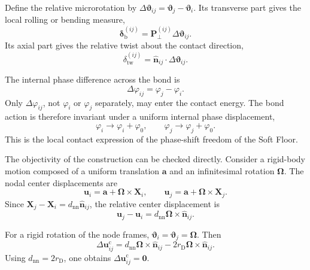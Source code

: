 Define the relative microrotation by $\Delta\boldsymbol{\vartheta}_{ij} = \boldsymbol{\vartheta}_j-\boldsymbol{\vartheta}_i$. Its transverse part gives the local rolling or bending measure,
\begin{equation}
    \boldsymbol{\delta}_{\mathrm{b}}^{(ij)} = \mathbf{P}_{\perp}^{(ij)} \Delta\boldsymbol{\vartheta}_{ij}.
\end{equation}
Its axial part gives the relative twist about the contact direction,
\begin{equation}
    \delta_{\mathrm{tw}}^{(ij)} = \hat{\mathbf{n}}_{ij} \cdot \Delta\boldsymbol{\vartheta}_{ij}.
\end{equation}

The internal phase difference across the bond is
\begin{equation}
    \Delta\varphi_{ij} = \varphi_j-\varphi_i.
\end{equation}
Only $\Delta\varphi_{ij}$, not $\varphi_i$ or $\varphi_j$ separately, may enter the contact energy. The bond action is therefore invariant under a uniform internal phase displacement,
\begin{equation}
    \varphi_i\rightarrow\varphi_i+\varphi_0, \qquad \varphi_j\rightarrow\varphi_j+\varphi_0.
\end{equation}
This is the local contact expression of the phase-shift freedom of the Soft Floor.

The objectivity of the construction can be checked directly. Consider a rigid-body motion composed of a uniform translation $\mathbf{a}$ and an infinitesimal rotation $\boldsymbol{\Omega}$. The nodal center displacements are
\begin{equation}
    \mathbf{u}_i = \mathbf{a}+\boldsymbol{\Omega}\times\mathbf{X}_i, \qquad \mathbf{u}_j = \mathbf{a}+\boldsymbol{\Omega}\times\mathbf{X}_j.
\end{equation}
Since $\mathbf{X}_j-\mathbf{X}_i = d_{\mathrm{nn}}\hat{\mathbf{n}}_{ij}$, the relative center displacement is
\begin{equation}
    \mathbf{u}_j-\mathbf{u}_i = d_{\mathrm{nn}} \boldsymbol{\Omega}\times\hat{\mathbf{n}}_{ij}.
\end{equation}

For a rigid rotation of the node frames, $\boldsymbol{\vartheta}_i = \boldsymbol{\vartheta}_j = \boldsymbol{\Omega}$. Then
\begin{equation}
    \Delta\mathbf{u}_{ij}^{\mathrm{c}} = d_{\mathrm{nn}} \boldsymbol{\Omega}\times\hat{\mathbf{n}}_{ij} - 2r_{\mathrm{D}} \boldsymbol{\Omega}\times\hat{\mathbf{n}}_{ij}.
\end{equation}
Using $d_{\mathrm{nn}}=2r_{\mathrm{D}}$, one obtains $\Delta\mathbf{u}_{ij}^{\mathrm{c}} = \mathbf{0}$.

